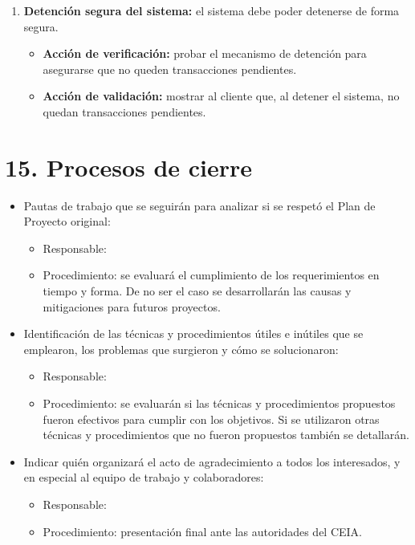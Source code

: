 \documentclass[
    11pt, %
]{charter}
\begin{document}
\begin{enumerate}
    \item \textbf{Detención segura del sistema:} el sistema debe poder detenerse de forma segura.
      \begin{itemize}
      \item \textbf{Acción de verificación:} probar el mecanismo de detención para asegurarse que no queden transacciones pendientes.
      \item \textbf{Acción de validación:} mostrar al cliente que, al detener el sistema, no quedan transacciones pendientes.
      \end{itemize}

    \end{enumerate}

    \section{15. Procesos de cierre}
    \label{sec:cierre}
    \begin{itemize}
    \item Pautas de trabajo que se seguirán para analizar si se respetó el Plan de Proyecto original:\\

      \begin{itemize}
      \item Responsable: \supname
      \item Procedimiento: se evaluará el cumplimiento de los requerimientos en tiempo y forma. De no ser el caso se desarrollarán las causas y mitigaciones para futuros proyectos.
      \end{itemize}
\newpage
    \item Identificación de las técnicas y procedimientos útiles e inútiles que se emplearon, los problemas que surgieron y cómo se solucionaron:\\
      \begin{itemize}
      \item Responsable: \supname
      \item Procedimiento: se evaluarán si las técnicas y procedimientos propuestos fueron efectivos para cumplir con los objetivos. Si se utilizaron otras técnicas y procedimientos que no fueron propuestos también se detallarán.
      \end{itemize}

    \item Indicar quién organizará el acto de agradecimiento a todos los interesados, y en especial al equipo de trabajo y colaboradores:\\
      \begin{itemize}
      \item Responsable: \supname
      \item Procedimiento: presentación final ante las autoridades del CEIA.
      \end{itemize}

    \end{itemize}
\end{document}
